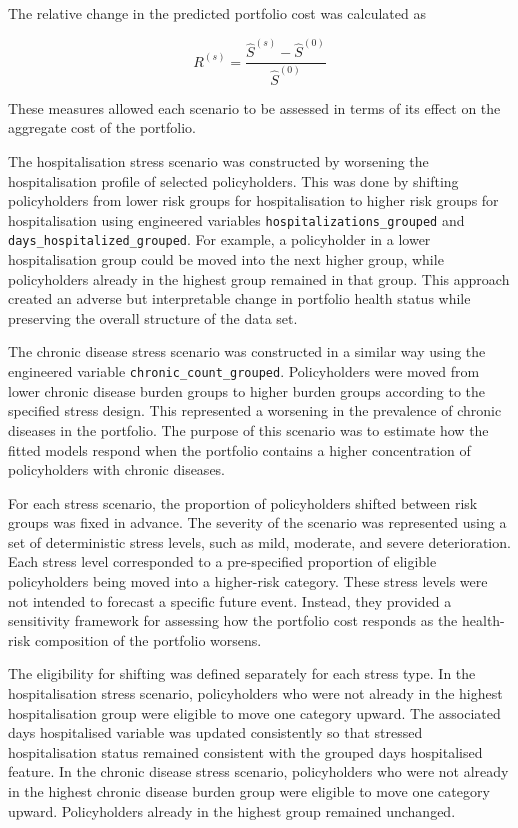 	The relative change in the predicted portfolio cost was calculated as
	
	\begin{equation}
		R^{(s)} =
		\frac{\hat{S}^{(s)} - \hat{S}^{(0)}}{\hat{S}^{(0)}}
	\end{equation}
	
	These measures allowed each scenario to be assessed in terms of its effect on the aggregate cost of the portfolio.
	
	The hospitalisation stress scenario was constructed by worsening the hospitalisation profile of selected policyholders. This was done by shifting policyholders from lower risk groups for hospitalisation to higher risk groups for hospitalisation using engineered variables \verb|hospitalizations_grouped| and \verb|days_hospitalized_grouped|. For example, a policyholder in a lower hospitalisation group could be moved into the next higher group, while policyholders already in the highest group remained in that group. This approach created an adverse but interpretable change in portfolio health status while preserving the overall structure of the data set.
	
	The chronic disease stress scenario was constructed in a similar way using the engineered variable \verb|chronic_count_grouped|. Policyholders were moved from lower chronic disease burden groups to higher burden groups according to the specified stress design. This represented a worsening in the prevalence of chronic diseases in the portfolio. The purpose of this scenario was to estimate how the fitted models respond when the portfolio contains a higher concentration of policyholders with chronic diseases.
	
	For each stress scenario, the proportion of policyholders shifted between risk groups was fixed in advance. The severity of the scenario was represented using a set of deterministic stress levels, such as mild, moderate, and severe deterioration. Each stress level corresponded to a pre-specified proportion of eligible policyholders being moved into a higher-risk category. These stress levels were not intended to forecast a specific future event. Instead, they provided a sensitivity framework for assessing how the portfolio cost responds as the health-risk composition of the portfolio worsens.
	
	The eligibility for shifting was defined separately for each stress type. In the hospitalisation stress scenario, policyholders who were not already in the highest hospitalisation group were eligible to move one category upward. The associated days hospitalised variable was updated consistently so that stressed hospitalisation status remained consistent with the grouped days hospitalised feature. In the chronic disease stress scenario, policyholders who were not already in the highest chronic disease burden group were eligible to move one category upward. Policyholders already in the highest group remained unchanged.
	
